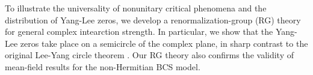 \documentclass[aps,prl,twocolumn,nofootinbib,superscriptaddress,notitlepage,longbibliography]{revtex4-1}
\begin{document}
	To illustrate the universality of nonunitary critical phenomena and the distribution of Yang-Lee zeros, we develop a %
	renormalization-group (RG) theory for general complex intearction strength.  %
	In particular, we show that the Yang-Lee zeros  take place on a semicircle of the complex plane, in sharp contrast to the original Lee-Yang circle theorem \cite{PhysRev.87.404,PhysRev.87.410}. Our RG theory also %
	confirms the validity of mean-field results for the non-Hermitian BCS model. %
\end{document}
